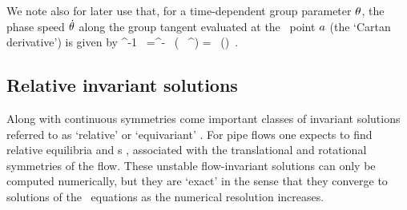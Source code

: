 \documentclass{jfm}
\begin{document}
We note also for later use that, for a time-dependent group parameter
${\bf \theta}$, the phase speed $\dot{{\bf \theta}}$ along the group tangent
evaluated at the \statesp\ point $a$ (the `Cartan derivative') is
given by
\beq
\LieEl^{-1}\dot{\LieEl} \,\ssp %
     =^{-\gSpace \Lg} \,
\left( \, %
                             ^{\gSpace \Lg}\right)\ssp
    =\dot{\gSpace} \, \groupTan(\ssp)
\,.

\subsection{Relative invariant solutions}
\label{s:RelInvSol}

Along with continuous symmetries come important classes of invariant
solutions referred to as `relative' or `equivariant'
\citep{Huyg1673,Poinc1896}. For pipe flows one expects to find relative
equilibria and \rpo s \citep{Rand82}, associated with the translational
and rotational symmetries of the flow.
These unstable flow-invariant solutions can
only be computed numerically, but they are `exact' in the sense that
they converge to solutions of the \NS\ equations as the
numerical resolution increases.
\end{document}
